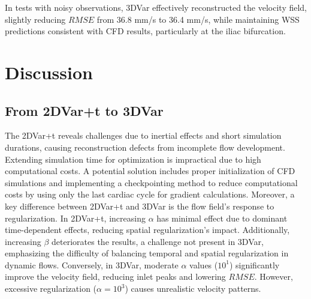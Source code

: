 In tests with noisy observations, 3DVar effectively reconstructed the velocity field, slightly reducing \(RMSE\) from 36.8 mm/s to 36.4 mm/s, while maintaining WSS predictions consistent with CFD results, particularly at the iliac bifurcation.


\section*{Discussion}


\subsection*{From 2DVar+t to 3DVar}
The 2DVar+t reveals challenges due to inertial effects and short simulation durations, causing reconstruction defects from incomplete flow development. Extending simulation time for optimization is impractical due to high computational costs. A potential solution includes proper initialization of CFD simulations and implementing a checkpointing method to reduce computational costs by using only the last cardiac cycle for gradient calculations.
Moreover, a key difference between 2DVar+t and 3DVar is the flow field's response to regularization. In 2DVar+t, increasing $\alpha$ has minimal effect due to dominant time-dependent effects, reducing spatial regularization's impact. Additionally, increasing $\beta$ deteriorates the results, a challenge not present in 3DVar, emphasizing the difficulty of balancing temporal and spatial regularization in dynamic flows. Conversely, in 3DVar, moderate $\alpha$ values ($10^{1}$) significantly improve the velocity field, reducing inlet peaks and lowering \(RMSE\). However, excessive regularization ($\alpha = 10^{3}$) causes unrealistic velocity patterns. 

